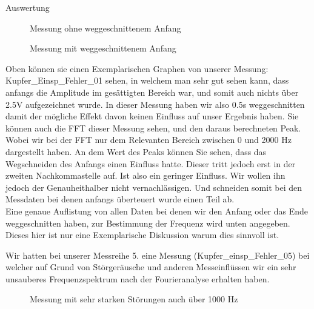 \documentclass[twoside]{protokoll}
\begin{document}
\begin{aufgabe}{Auswertung}
\begin{figure}[H]
  \centering
  \caption{Messung ohne weggeschnittenem Anfang}
  \hfill
\end{figure}

\begin{figure}[H]
  \centering
  \caption{Messung mit weggeschnittenem Anfang}
  \hfill
\end{figure}

Oben können sie einen Exemplarischen Graphen von unserer Messung: Kupfer\_Einsp\_Fehler\_01 sehen, in welchem man sehr gut sehen kann, dass anfangs die Amplitude im gesättigten Bereich war, und somit auch nichts über 2.5V aufgezeichnet wurde.
In dieser Messung haben wir also 0.5s weggeschnitten damit der mögliche Effekt davon keinen Einfluss auf unser Ergebnis haben.
Sie können auch die FFT dieser Messung sehen, und den daraus berechneten Peak.
Wobei wir bei der FFT nur dem Relevanten Bereich zwischen 0 und 2000 Hz dargestellt haben.
An dem Wert des Peaks können Sie sehen, dass das Wegschneiden des Anfangs einen Einfluss hatte.
Dieser tritt jedoch erst in der zweiten Nachkommastelle auf.
Ist also ein geringer Einfluss.
Wir wollen ihn jedoch der Genauheithalber nicht vernachlässigen.
Und schneiden somit bei den Messdaten bei denen anfangs überteuert wurde einen Teil ab. \\


Eine genaue Auflistung von allen Daten bei denen wir den Anfang oder das Ende weggeschnitten haben, zur Bestimmung der Frequenz wird unten angegeben.
Dieses hier ist nur eine Exemplarische Diskussion warum dies sinnvoll ist.

Wir hatten bei unserer Messreihe 5. eine Messung (Kupfer\_einsp\_Fehler\_05) bei welcher auf Grund von Störgeräusche und anderen Messeinflüssen wir ein sehr unsauberes Frequenzspektrum nach der Fourieranalyse erhalten haben.
\begin{figure}[H]
  \centering
    \caption{Messung mit sehr starken Störungen auch über 1000 Hz}
  \hfill
\end{figure}


\end{aufgabe}
\end{document}
